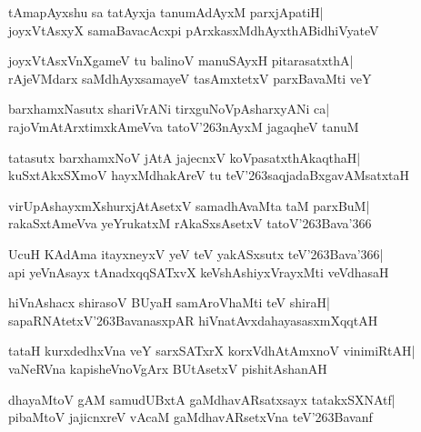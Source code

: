 \documentclass[twoside,12pt,openright]{book}
\def\S{\char'263}
\newcounter{shloka}[chapter]
\begin{document}
\begin{shloka}%
tAmapAyxshu sa tatAyxja tanumAdAyxM parxjApatiH|\\
joyxVtAsxyX samaBavacAcxpi pArxkasxMdhAyxthABidhiVyateV
\end{shloka}

\begin{shloka}%
joyxVtAsxVnXgameV tu balinoV manuSAyxH pitarasatxthA|\\
rAjeVMdarx saMdhAyxsamayeV tasAmxtetxV parxBavaMti veY
\end{shloka}

\begin{shloka}%
barxhamxNasutx shariVrANi tirxguNoVpAsharxyANi ca|\\
rajoVmAtArxtimxkAmeVva tatoV\S nAyxM jagaqheV tanuM
\end{shloka}

\begin{shloka}%
tatasutx barxhamxNoV jAtA jajecnxV koVpasatxthAkaqthaH|\\
kuSxtAkxSXmoV hayxMdhakAreV tu teV\S saqjadaBxgavAMsatxtaH
\end{shloka}

\begin{shloka}%
virUpAshayxmXshurxjAtAsetxV samadhAvaMta taM parxBuM|\\
rakaSxtAmeVva yeYrukatxM rAkaSxsAsetxV tatoV\S Bava\char'366
\end{shloka}

\begin{shloka}%
UcuH KAdAma itayxneyxV yeV teV yakASxsutx teV\S Bava\char'366|\\
api yeVnAsayx tAnadxqqSATxvX keVshAshiyxVrayxMti veVdhasaH
\end{shloka}

\begin{shloka}%
hiVnAshacx shirasoV BUyaH samAroVhaMti teV shiraH|\\
sapaRNAtetxV\S BavanasxpAR hiVnatAvxdahayasasxmXqqtAH
\end{shloka}

\begin{shloka}%
tataH kurxdedhxVna veY sarxSATxrX korxVdhAtAmxnoV vinimiRtAH|\\
vaNeRVna kapisheVnoVgArx BUtAsetxV pishitAshanAH
\end{shloka}

\begin{shloka}%
dhayaMtoV gAM samudUBxtA gaMdhavARsatxsayx tatakxSXNAtf|\\
pibaMtoV jajicnxreV vAcaM gaMdhavARsetxVna teV\S Bavanf
\end{shloka}
\end{document}
